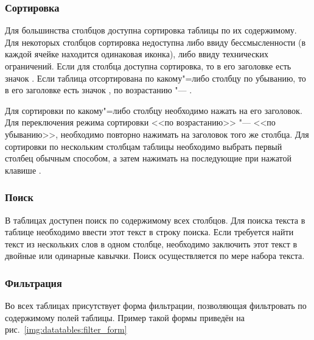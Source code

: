 \subsubsection{Сортировка}

Для большинства столбцов доступна сортировка таблицы по их содержимому. Для некоторых столбцов сортировка недоступна
либо ввиду бессмысленности (в каждой ячейке находится одинаковая иконка), либо ввиду технических ограничений.
Если для столбца доступна сортировка, то в его заголовке есть значок .
Если таблица отсортирована по какому"=либо столбцу по убыванию, то в его заголовке есть значок ,
по возрастанию "--- .

Для сортировки по какому"=либо столбцу необходимо нажать на его заголовок. Для переключения режима сортировки <<по возрастанию>> "--- <<по убыванию>>,
необходимо повторно нажимать на заголовок того же столбца. Для сортировки по нескольким столбцам таблицы необходимо выбрать первый столбец обычным способом,
а затем нажимать на последующие при нажатой клавише .

\subsubsection{Поиск}

В таблицах доступен поиск по содержимому всех столбцов. Для поиска текста в таблице необходимо ввести этот текст в строку поиска. Если требуется 
найти текст из нескольких слов в одном столбце, необходимо заключить этот текст в двойные или одинарные кавычки. Поиск осуществляется по мере набора текста.

\subsubsection{Фильтрация}

Во всех таблицах присутствует форма фильтрации, позволяющая фильтровать по содержимому полей таблицы. Пример такой формы приведён на рис.~\ref{img:datatables:filter_form}


